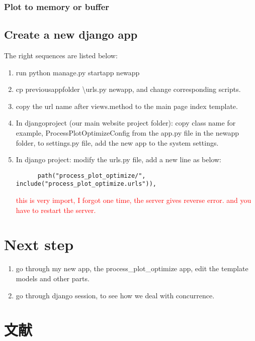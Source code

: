 \documentclass[UTF8,fancyhdr,a4paper]{ctexart}
\newcommand{\pflred}[1]{\textcolor{red}{#1}}
\begin{document}
\subsubsection{Plot to memory or buffer}

\subsection{Create a new django app}
The right sequences are listed below:
\begin{enumerate}
      \item run python manage.py startapp newapp
      \item cp previous\textunderscore app\textunderscore folder \textbackslash urls.py newapp, and change corresponding scripts.
      \item copy the url name after views.method to the main page index template.
      \item In django\textunderscore project (our main website project folder): copy class name for example, ProcessPlotOptimizeConfig from the app.py file in the newapp folder, to settings.py file, add the new app to the system settings.
      \item In django \textunderscore project: modify the urls.py file, add a new line as below: \begin{verbatim}
      path("process_plot_optimize/", include("process_plot_optimize.urls")),
      \end{verbatim} \pflred{this is very import, I forgot one time, the server gives reverse error. and you have to restart the server.}
\end{enumerate}




\section{Next step}
\begin{enumerate}
      \item go through my new app, the process\_plot\_optimize app, edit the template models and other parts.
      \item go through django session, to see how we deal with concurrence.
\end{enumerate}















\newpage
\section{文献}
\cite{10cm}


\end{document}
